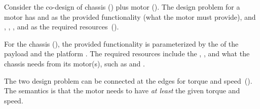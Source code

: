 \begin{example}
\label{exa:chassis_plus_motor}Consider the co-design of chassis ()
plus motor (). The design problem for a motor has 
and  as the provided functionality (what the motor must
provide), and , , , and 
as the required resources~().


\noindent For the chassis (), the provided
functionality is parameterized by the  of the payload and
the platform . The required resources include the ,
, and what the chassis needs from its motor(s), such
as  and .


\noindent The two design problem can be connected at the edges for
torque and speed~(). The
semantics is that the motor needs to have\emph{ at least }the given
torque and speed. 



\end{example}
